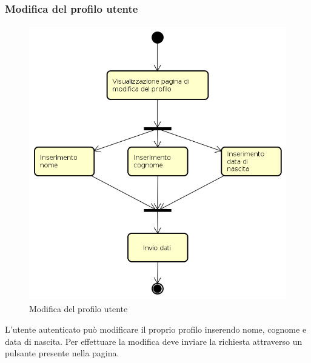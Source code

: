 \subsubsection{Modifica del profilo utente}
\begin{figure}[H]
\begin{center}
\includegraphics[height=12cm]{res/sections/backend/activities/modificaProfilo.png}
\caption{Modifica del profilo utente}
\end{center}
\end{figure}
L'utente autenticato può modificare il proprio profilo inserendo nome, cognome e data di nascita. Per effettuare la modifica deve inviare la richiesta attraverso un pulsante presente nella pagina.
